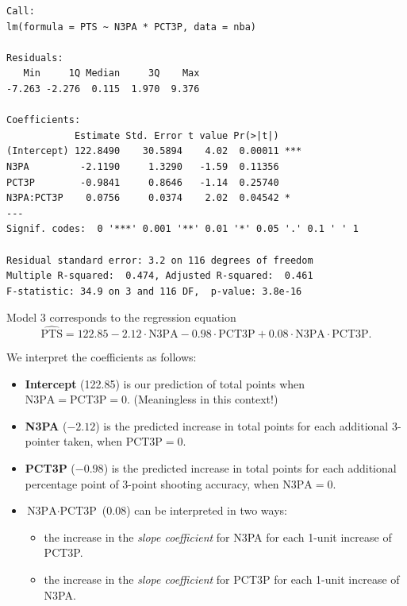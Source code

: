 \documentclass{beamer}\usepackage[]{graphicx}\usepackage[]{color}
\makeatletter
\newenvironment{kframe}{%
 \def\at@end@of@kframe{}%
 \ifinner\ifhmode%
  \def\at@end@of@kframe{\end{minipage}}%
  \begin{minipage}{\columnwidth}%
 \fi\fi%
 \def\FrameCommand##1{\hskip\@totalleftmargin \hskip-\fboxsep
 \colorbox{shadecolor}{##1}\hskip-\fboxsep
     \hskip-\linewidth \hskip-\@totalleftmargin \hskip\columnwidth}%
 \MakeFramed {\advance\hsize-\width
   \@totalleftmargin\z@ \linewidth\hsize
   \@setminipage}}%
 {\par\unskip\endMakeFramed%
 \at@end@of@kframe}
\newenvironment{knitrout}{}{} %
\makeatother
\begin{document}
\begin{darkframes}
\begin{frame}[fragile]
\begin{knitrout}
\begin{kframe}
\begin{verbatim}
Call:
lm(formula = PTS ~ N3PA * PCT3P, data = nba)

Residuals:
   Min     1Q Median     3Q    Max 
-7.263 -2.276  0.115  1.970  9.376 

Coefficients:
            Estimate Std. Error t value Pr(>|t|)    
(Intercept) 122.8490    30.5894    4.02  0.00011 ***
N3PA         -2.1190     1.3290   -1.59  0.11356    
PCT3P        -0.9841     0.8646   -1.14  0.25740    
N3PA:PCT3P    0.0756     0.0374    2.02  0.04542 *  
---
Signif. codes:  0 '***' 0.001 '**' 0.01 '*' 0.05 '.' 0.1 ' ' 1

Residual standard error: 3.2 on 116 degrees of freedom
Multiple R-squared:  0.474,	Adjusted R-squared:  0.461 
F-statistic: 34.9 on 3 and 116 DF,  p-value: 3.8e-16
\end{verbatim}
\end{kframe}
\end{knitrout}
    \end{frame}

    \begin{frame}[fragile]

      Model 3 corresponds to the regression equation
      \[
        \widehat{\text{PTS}} = 122.85
          - 2.12 \cdot\text{N3PA}
          - 0.98 \cdot\text{PCT3P}
          + 0.08 \cdot\text{N3PA}\cdot\text{PCT3P}.
      \]

      \pause

      We interpret the coefficients as follows:
      \begin{itemize}[<+->]
        \item \textbf{Intercept} (122.85) is our prediction of total points when $\text{N3PA}=\text{PCT3P}=0$. (Meaningless in this context!)
        \item \textbf{N3PA} ($-2.12$) is the predicted increase in total points for each additional 3-pointer taken, when $\text{PCT3P}=0$.
        \item \textbf{PCT3P} ($-0.98$)  is the predicted increase in total points for each additional percentage point of 3-point shooting accuracy, when $\text{N3PA}=0$.
        \item \textbf{$\text{N3PA}\cdot\text{PCT3P}$} ($0.08$) can be interpreted in two ways:\pause
          \begin{itemize}[<+->]
            \item the increase in the \emph{slope coefficient} for N3PA for each 1-unit increase of PCT3P.
            \item the increase in the \emph{slope coefficient} for PCT3P for each 1-unit increase of N3PA.
          \end{itemize}
      \end{itemize}
    \end{frame}


\end{darkframes}
\end{document}
